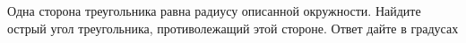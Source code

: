 \begin{ex}
	\begin{condition}
		Одна сторона треугольника равна радиусу описанной окружности. Найдите острый угол треугольника, противолежащий этой стороне. Ответ дайте в градусах
	\end{condition}
\end{ex}